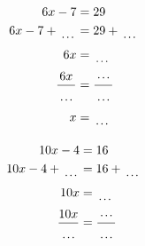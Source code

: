 \documentclass[12pt]{article}
\newcounter{minipagecount}
\begin{document}
\begin{multicols}{2}
\begin{minipage}[t]{0.45\textwidth}
    \raggedright %
    \begin{align*} %
        6x - 7 &= 29\\
        6x - 7 + \dotuline{\hspace{5mm}} &= 29 + \dotuline{\hspace{5mm}}\\
        6x &= \dotuline{\hspace{5mm}}\\
        \frac{6x}{\dotuline{\hspace{5mm}}} &= \frac{\dotuline{\hspace{5mm}}}{\dotuline{\hspace{5mm}}}\\
        x &= \dotuline{\hspace{5mm}}\\
    \end{align*}
\end{minipage} %
\noindent{(\theminipagecount)}\hspace{0.1mm} %
\begin{minipage}[t]{0.45\textwidth} %
    \vspace{-26pt}  %
    \raggedright %
    \begin{align*} %
        10x - 4 &= 16\\
        10x - 4 + \dotuline{\hspace{5mm}} &= 16 + \dotuline{\hspace{5mm}}\\
        10x &= \dotuline{\hspace{5mm}}\\
        \frac{10x}{\dotuline{\hspace{5mm}}} &= \frac{\dotuline{\hspace{5mm}}}{\dotuline{\hspace{5mm}}}\\

\end{align*}
\end{minipage}
\end{multicols}
\end{document}
